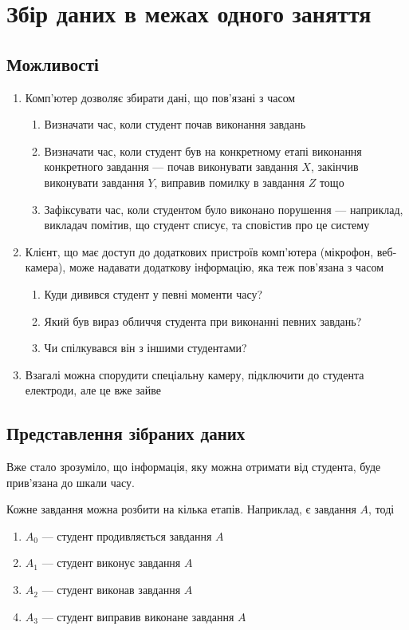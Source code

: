 \chapter{Збір даних в межах одного заняття}
\section{Можливості}

\begin{enumerate}
  \item
    Комп’ютер дозволяє збирати дані, що пов’язані з часом
    \begin{enumerate}
      \item
        Визначати час, коли студент почав виконання завдань
      \item
        Визначати час, коли студент був на конкретному етапі виконання
        конкретного завдання --- почав виконувати завдання $X$, закінчив
        виконувати завдання $Y$, виправив помилку в завдання $Z$ тощо
      \item
        Зафіксувати час, коли студентом було виконано порушення ---
        наприклад, викладач помітив, що студент списує, та сповістив про це
        систему
    \end{enumerate}
  \item
    Клієнт, що має доступ до додаткових пристроїв комп’ютера (мікрофон,
    веб-камера), може надавати додаткову інформацію, яка теж пов’язана з
    часом
    \begin{enumerate}
      \item
        Куди дивився студент у певні моменти часу?
      \item
        Який був вираз обличчя студента при виконанні певних завдань?
      \item
        Чи спілкувався він з іншими студентами?
    \end{enumerate}
  \item
    Взагалі можна спорудити спеціальну камеру, підключити до студента
    електроди, але це вже зайве
\end{enumerate}

\section{Представлення зібраних даних}

Вже стало зрозуміло, що інформація, яку можна отримати від студента, буде
прив’язана до шкали часу.

Кожне завдання можна розбити на кілька етапів.
Наприклад, є завдання $A$, тоді
\begin{enumerate}
  \item
    $A_0$ --- студент продивляється завдання $A$
  \item
    $A_1$ --- студент виконує завдання $A$
  \item
    $A_2$ --- студент виконав завдання $A$
  \item
    $A_3$ --- студент виправив виконане завдання $A$
\end{enumerate}

